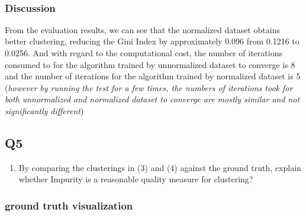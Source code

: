 \documentclass[11pt]{article}
\providecommand{\tightlist}{%
      \setlength{\itemsep}{0pt}\setlength{\parskip}{0pt}}
\begin{document}
    \begin{center}
    \end{center}
    { \hspace*{\fill} \\}
    
    \subsubsection*{Discussion}\label{discussion}

    From the evaluation results, we can see that the normalized dataset
obtains better clustering, reducing the Gini Index by approximately
0.096 from 0.1216 to 0.0256. And with regard to the computational cost,
the number of iterations consumed to for the algorithm trained by
unnormalized dataset to converge is 8 and the number of iterations for
the algorithm trained by normalized dataset is 5 (\emph{however by
running the test for a few times, the numbers of iterations took for
both unnormalized and normalized dataset to converge are mostly similar
and not significantly different})

    \subsection*{Q5}\label{q5}

\begin{enumerate}
\def\labelenumi{\arabic{enumi}.}
\setcounter{enumi}{4}
\tightlist
\item
  By comparing the clusterings in (3) and (4) against the ground truth,
  explain whether Impurity is a reasonable quality measure for
  clustering?
\end{enumerate}

    \subsubsection*{ground truth
visualization}\label{ground-truth-visualization}
\end{document}
